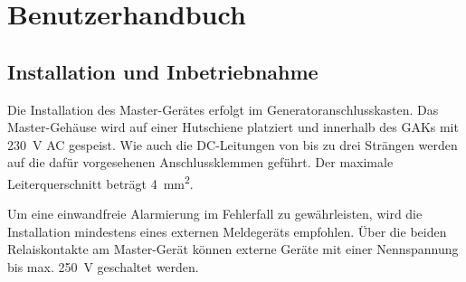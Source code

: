 \chapter{Benutzerhandbuch}
\label{chap:userguide}

\noindent{}
\noindent{}

\section{Installation und Inbetriebnahme}
\label{sec:userguide:installation}

Die Installation des Master-Ger\"ates erfolgt im Generatoranschlusskasten. Das
Master-Geh\"ause  wird  auf  einer  Hutschiene  platziert  und  innerhalb  des
GAKs  mit  \SI{230}{\volt} AC  gespeist. Wie  auch  die DC-Leitungen  von  bis
zu  drei  Str\"angen  werden  auf die  daf\"ur  vorgesehenen  Anschlussklemmen
gef\"uhrt. Der maximale  Leiterquerschnitt
betr\"agt \SI{4}{\milli\meter\squared}.

Um eine  einwandfreie Alarmierung im  Fehlerfall zu gew\"ahrleisten,  wird die
Installation  mindestens eines  externen  Meldeger\"ats empfohlen. \"Uber  die
beiden Relaiskontakte  am Master-Ger\"at  k\"onnen externe Ger\"ate  mit einer
Nennspannung bis max. \SI{250}{\volt}  geschaltet werden.

